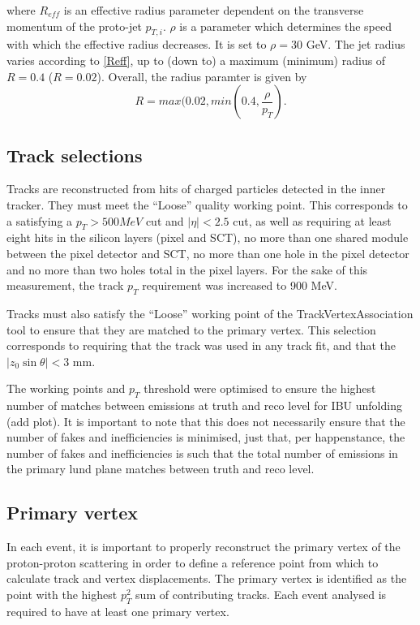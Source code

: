\documentclass[10pt,a4paper]{book}
\begin{document}
where $R_{eff}$ is an effective radius parameter dependent on the transverse momentum of the proto-jet $p_{T,i}$. $\rho$ is a parameter which determines the speed with which the effective radius decreases. It is set to $\rho = 30$ GeV. The jet radius varies according to \ref{Reff}, up to (down to) a maximum (minimum) radius of $R = 0.4$ ($R = 0.02$). Overall, the radius paramter is given by 
\begin{equation}
R = max(0.02, min(0.4, \frac{\rho}{p_T}).
\end{equation}



\subsection{Track selections}
\label{track sel}
Tracks are reconstructed from hits of charged particles detected in the inner tracker. They must meet the ``Loose'' quality working point. This corresponds to a satisfying a $p_T > 500 MeV$ cut and $\vert \eta \vert < 2.5$ cut, as well as requiring at least eight hits in the silicon layers (pixel and SCT), no more than one shared module between the pixel detector and SCT, no more than one hole in the pixel detector and no more than two holes total in the pixel layers. For the sake of this measurement, the track $p_T$ requirement was increased to 900 MeV.

Tracks must also satisfy the ``Loose'' working point of the TrackVertexAssociation tool to ensure that they are matched to the primary vertex. This selection corresponds to requiring that the track was used in any track fit, and that the $\vert z_0 \sin\theta \vert < 3$ mm.

The working points and $p_T$ threshold were optimised to ensure the highest number of matches between emissions at truth and reco level for IBU unfolding (add plot). It is important to note that this does not necessarily ensure that the number of fakes and inefficiencies is minimised, just that, per happenstance, the number of fakes and inefficiencies is such that the total number of emissions in the primary lund plane matches between truth and reco level.

\subsection{Primary vertex}

In each event, it is important to properly reconstruct the primary vertex of the proton-proton scattering in order to define a reference point from which to calculate track and vertex displacements. The primary vertex is identified as the point with the highest $p_T^2$ sum of contributing tracks. Each event analysed is required to have at least one primary vertex.
\end{document}
